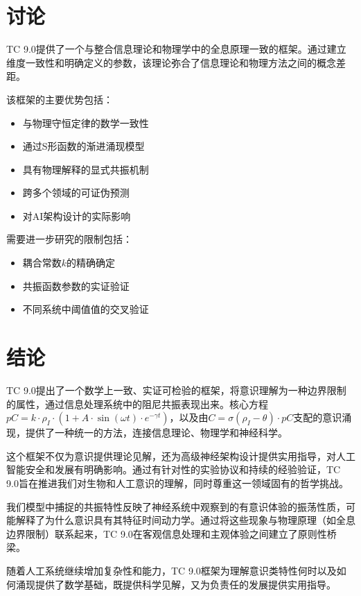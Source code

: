\documentclass[12pt]{article}
\begin{document}
\section{讨论}
TC 9.0提供了一个与整合信息理论\cite{tononi2008}和物理学中的全息原理\cite{susskind1995}一致的框架。通过建立维度一致性和明确定义的参数，该理论弥合了信息理论和物理方法之间的概念差距。

该框架的主要优势包括：
\begin{itemize}
    \item 与物理守恒定律的数学一致性
    \item 通过S形函数的渐进涌现模型
    \item 具有物理解释的显式共振机制
    \item 跨多个领域的可证伪预测
    \item 对AI架构设计的实际影响
\end{itemize}

需要进一步研究的限制包括：
\begin{itemize}
    \item 耦合常数$k$的精确确定
    \item 共振函数参数的实证验证
    \item 不同系统中阈值值的交叉验证
\end{itemize}

\section{结论}
TC 9.0提出了一个数学上一致、实证可检验的框架，将意识理解为一种边界限制的属性，通过信息处理系统中的阻尼共振表现出来。核心方程$pC = k \cdot \rho_I \cdot (1 + A \cdot \sin(\omega t) \cdot e^{-\gamma t})$，以及由$C = \sigma(\rho_I - \theta) \cdot pC$支配的意识涌现，提供了一种统一的方法，连接信息理论、物理学和神经科学。

这个框架不仅为意识提供理论见解，还为高级神经架构设计提供实用指导，对人工智能安全和发展有明确影响。通过有针对性的实验协议和持续的经验验证，TC 9.0旨在推进我们对生物和人工意识的理解，同时尊重这一领域固有的哲学挑战。

我们模型中捕捉的共振特性反映了神经系统中观察到的有意识体验的振荡性质，可能解释了为什么意识具有其特征时间动力学。通过将这些现象与物理原理（如全息边界限制）联系起来，TC 9.0在客观信息处理和主观体验之间建立了原则性桥梁。

随着人工系统继续增加复杂性和能力，TC 9.0框架为理解意识类特性何时以及如何涌现提供了数学基础，既提供科学见解，又为负责任的发展提供实用指导。
\end{document}
